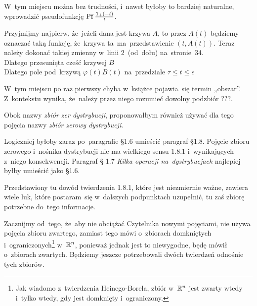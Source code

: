\documentclass[a4paper,11pt]{article}
\begin{document}
\VerSpaceFour





\noindent
{} W~tym miejscu można bez trudności, i~nawet byłoby to
bardziej naturalne, wprowadzić pseudofunkcję
$\mathrm{Pf}\, \frac{ \mathbf{1}_{ + }( -t )}{ t }$.

\VerSpaceFour





\noindent
{} Przyjmijmy najpierw, że~jeżeli dana jest krzywa
$A$, to przez $A( t )$ będziemy oznaczać taką funkcję, że~krzywa
ta~ma~przedstawienie $( t, A( t ) )$. Teraz należy dokonać takiej
zmienny w~linii 2~(od~dołu) na~stronie~34. \\
\Jest  Dlatego przesunięta cześć krzywej $B$ \\
\Powin Dlatego pole pod~krzywą $\varphi( t ) B( t )$ na~przedziale
$\tau \leq t \leq \epsilon$

\VerSpaceFour





\noindent
{} W~tym miejscu po raz pierwszy chyba w~książce
pojawia~się termin „obszar”. Z~kontekstu wynika, że~należy przez
niego rozumieć dowolny podzbiór $???$.

\VerSpaceFour





\noindent
{} Obok nazwy \textit{zbiór zer dystrybucji}, proponowałbym
również używać dla tego pojęcia nazwy \textit{zbiór zerowy dystrybucji}.

\VerSpaceFour




\noindent
{} Logiczniej byłoby zaraz po~paragrafie \S 1.6 umieścić
paragraf \S 1.8. Pojęcie zbioru zerowego i~nośnika dystrybucji nie ma
wielkiego sensu 1.8.1 i~wynikających z~niego konsekwencji. Paragraf \S
1.7 \textit{Kilka operacji na~dystrybucjach} najlepiej byłby umieścić
jako \S 1.6.

\VerSpaceFour





\noindent
{} Przedstawiony tu dowód twierdzenia 1.8.1, które
jest niezmiernie ważne, zawiera wiele luk, które postaram~się
w~dalszych podpunktach uzupełnić, tu zaś zbiorę potrzebne do~tego
informacje.

Zacznijmy od~tego, że~aby nie obciążać Czytelnika nowymi pojęciami,
nie używa pojęcia zbioru zwartego, zamiast tego mówi o~zbiorach
domkniętych i~ograniczonych\footnote{Jak wiadomo z~twierdzenia
  Heinego-Borela, zbiór w~$\mathbb{R}^{ n }$ jest zwarty wtedy i~tylko
  wtedy, gdy jest domknięty i~ograniczony.} w~$\mathbb{R}^{ n }$, ponieważ jednak
jest to niewygodne, będę mówił o~zbiorach zwartych. Będziemy jeszcze
potrzebowali dwóch twierdzeń odnośnie tych zbiorów.
\end{document}
